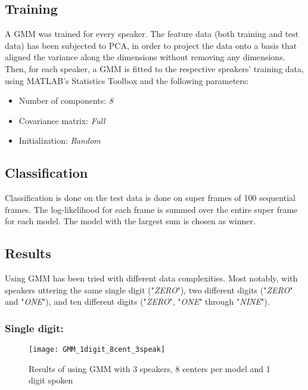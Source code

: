 \subsection{Training}
A GMM was trained for every speaker.
The feature data (both training and test data) has been subjected to PCA, in order to project the data onto a basis that aligned the variance along the dimensions without removing any dimensions. 
Then, for each speaker, a GMM is fitted to the respective speakers' training data, using MATLAB's Statistics Toolbox and the following parameters:

\begin{itemize}

\item
Number of components: \textit{8}

\item
Covariance matrix: \textit{Full}

\item
Initialization: \textit{Random}

\end{itemize}

\subsection{Classification}
Classification is done on the test data is done on super frames of 100 sequential frames.
The log-likelihood for each frame is summed over the entire super frame for each model.
The model with the largest sum is chosen as winner.



\subsection{Results}
Using GMM has been tried with different data complexities.
Most notably, with speakers uttering the same single digit ("\textit{ZERO}"), two different digits ("\textit{ZERO}" and "\textit{ONE}"), and ten different digits ("\textit{ZERO}", "\textit{ONE}" through "\textit{NINE}").

\subsubsection{Single digit:}

\begin{figure}[H]
\centering
\texttt{[image: GMM\_1digit\_8cent\_3speak]}
\caption{Results of using GMM with 3 speakers, 8 centers per model and 1 digit spoken}
\label{fig:GMM_fig_1}
\end{figure}

